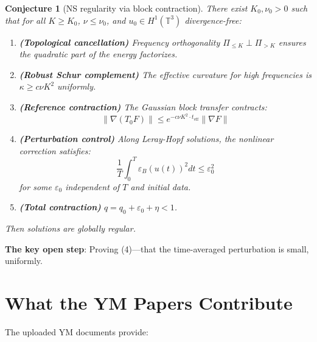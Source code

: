 \documentclass[11pt]{article}
\newtheorem{conjecture}[theorem]{Conjecture}
\theoremstyle{definition}
\newcommand{\T}{\mathbb{T}}
\begin{document}
\begin{conjecture}[NS regularity via block contraction]
There exist $K_0, \nu_0 > 0$ such that for all $K \geq K_0$, $\nu \leq \nu_0$, and 
$u_0 \in H^1(\T^3)$ divergence-free:

\begin{enumerate}
\item \textbf{(Topological cancellation)} Frequency orthogonality $\Pi_{\leq K} \perp \Pi_{>K}$ 
ensures the quadratic part of the energy factorizes.

\item \textbf{(Robust Schur complement)} The effective curvature for high frequencies 
is $\kappa \geq c \nu K^2$ uniformly.

\item \textbf{(Reference contraction)} The Gaussian block transfer contracts:
\begin{equation}
\|\nabla(T_0 F)\| \leq e^{-c\nu K^2 \cdot t_{\mathrm{eff}}} \|\nabla F\|
\end{equation}

\item \textbf{(Perturbation control)} Along Leray-Hopf solutions, the nonlinear correction satisfies:
\begin{equation}
\frac{1}{T}\int_0^T \varepsilon_B(u(t))^2 dt \leq \varepsilon_0^2
\end{equation}
for some $\varepsilon_0$ independent of $T$ and initial data.

\item \textbf{(Total contraction)} $q = q_0 + \varepsilon_0 + \eta < 1$.
\end{enumerate}

Then solutions are globally regular.
\end{conjecture}

\textbf{The key open step}: Proving (4)---that the time-averaged perturbation is small, 
uniformly.

\section{What the YM Papers Contribute}

The uploaded YM documents provide:
\end{document}
